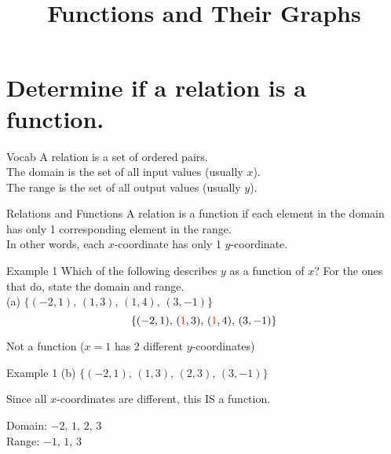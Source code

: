 \documentclass[t,usenames,dvipsnames]{beamer}
\title{Functions and Their Graphs}
\author{}
\date{}
\begin{document}
\begin{frame}
    \maketitle
\end{frame}

\section{Determine if a relation is a function.}

\begin{frame}{Vocab}
    A \alert{relation} is a set of ordered pairs.  \newline\\
    
    The \alert{domain} is the set of all input values (usually $x$).   \newline\\
    
    The \alert{range} is the set of all output values (usually $y$).
\end{frame}

\begin{frame}{Relations and Functions}
    A relation is a \alert{function} if each element in the domain has only 1 corresponding element in the range.  \newline\\
    
    In other words, each $x$-coordinate has only 1 $y$-coordinate.
\end{frame}

\begin{frame}{Example 1}
Which of the following describes $y$ as a function of $x$? For the ones that do, state the domain and range.  \newline\\

(a) \quad $\{(-2,1), \, (1, 3), \, (1, 4), \, (3, -1)\}$ \newline\\  \pause
\[\{(-2,1), \, ({\color{red} 1}, 3), \, ({\color{red} 1}, 4), \, (3, -1)\}\]    \pause

Not a function ($x=1$ has 2 different $y$-coordinates)
\end{frame}

\begin{frame}{Example 1}
(b) \quad   $\{(-2,1), \, (1,3),  \, (2,3), \, (3,-1)\}$    \newline\\  \pause

Since all $x$-coordinates are different, this IS a function.    \newline\\  \pause

Domain: $-2, \, 1, \, 2, \, 3$  \newline\\
Range: $-1, \, 1, \, 3$
\end{frame}
\end{document}
